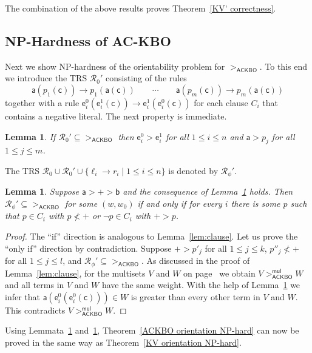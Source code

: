 \documentclass{tlp}
\newcommand{\qed}{\hspace*{1em}\hbox{\proofbox}}
\newtheorem{lemma}[theorem]{Lemma}
\newcommand{\m}[1]{\mathsf{#1}}
\newcommand{\mc}[1]{\mathcal{#1}}
\newcommand{\mr}[1]{\mathrm{#1}}
\newcommand{\mul}{\m{mul}}
\newcommand{\ackbo}{\mr{\m{ACKBO}}}
\newcommand{\RR}{\mc{R}}
\newcommand{\High}{\m{a}}
\newcommand{\Low}{\m{b}}
\newcommand{\Bot}{\m{c}}
\newcommand{\ToP}{\m{e}}
\begin{document}
The combination of the above results proves Theorem~\ref{KV' correctness}.


\subsection{NP-Hardness of AC-KBO}
\label{sec:ACKBO NP-hard}

Next we show NP-hardness of the orientability problem for $>_\ackbo$.
To this end we introduce the TRS $\RR_0'$ consisting of the rules
\[
\High(p_1(\Bot)) \to p_1(\High(\Bot))
\qquad\cdots\qquad
\High(p_m(\Bot)) \to p_m(\High(\Bot))
\]
together with a rule
$\ToP_i^0(\ToP_i^1(\Bot)) \to \ToP_i^1(\ToP_i^0(\Bot))$
for each clause $C_i$ that contains a negative literal.
The next property is immediate.

\begin{lemma}
\label{lem:base2}
If $\RR_0' \subseteq {>_\ackbo}$ then
$\ToP_i^0 > \ToP_i^1$ for all $1 \leqslant i \leqslant n$ and
$\High > p_j$ for all $1 \leqslant j \leqslant m$.
\qed
\end{lemma}

The TRS $\RR_0 \cup \RR_0' \cup
\{ \ell_i \to r_i \mid 1 \leqslant i \leqslant n \}$
is denoted by $\RR_\phi'$.

\begin{lemma}
\label{lem:base3}
Suppose $\High > + > \Low$
and the consequence of Lemma~\ref{lem:base2} holds.
Then $\RR_\phi' \subseteq {>_\ackbo}$
for some $(w, w_0)$ if and only if for every $i$
there is some $p$ such that $p \in C_i$ with $p \nless +$ or
$\neg p \in C_i$ with $+ > p$.
\end{lemma}
\begin{proof}
The ``if'' direction is analogous to Lemma~\ref{lem:clause}.
Let us prove the ``only if'' direction by contradiction.
Suppose $+ > p'_j$ for all $1 \leqslant j \leqslant k$,
$p''_j \nless +$ for all $1 \leqslant j \leqslant l$,
and $\RR_\phi' \subseteq {>_\ackbo}$.
As discussed in the proof of Lemma~\ref{lem:clause},
for the multisets $V$ and $W$ 
on page~\pageref{encoding}
we obtain $V >_\ackbo^\mul W$ and
all terms in $V$ and $W$ have the same weight.
With the help of Lemma~\ref{lem:base2} we infer that
$\High(\ToP_i^0(\ToP_i^0(\Bot))) \in W$ is greater than every
other term in $V$ and $W$.
This contradicts $V >_\ackbo^\mul W$.
\end{proof}

Using Lemmata~\ref{lem:base2} and~\ref{lem:base3},
Theorem~\ref{ACKBO orientation NP-hard} can now be proved
in the same way as Theorem~\ref{KV orientation NP-hard}.
\end{document}
